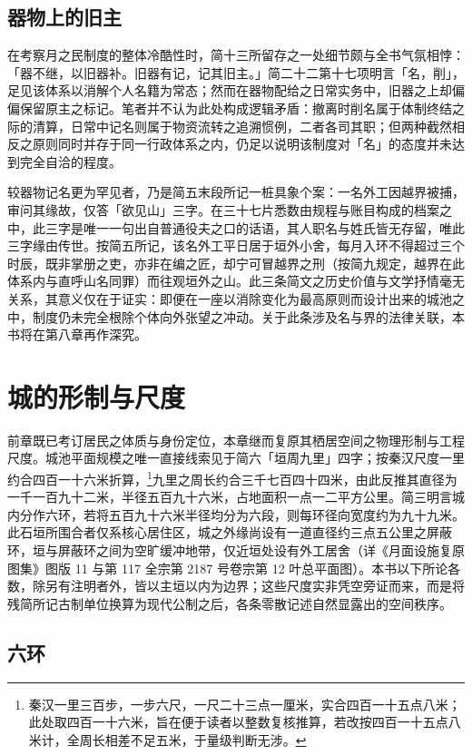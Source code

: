 \section{器物上的旧主}

在考察月之民制度的整体冷酷性时，简十三所留存之一处细节颇与全书气氛相悖：「器不继，以旧器补。旧器有记，记其旧主。」简二十二第十七项明言「名，削」，足见该体系以消解个人名籍为常态；然而在器物配给之日常实务中，旧器之上却偏偏保留原主之标记。笔者并不认为此处构成逻辑矛盾：撤离时削名属于体制终结之际的清算，日常中记名则属于物资流转之追溯惯例，二者各司其职；但两种截然相反之原则同时并存于同一行政体系之内，仍足以说明该制度对「名」的态度并未达到完全自洽的程度。

较器物记名更为罕见者，乃是简五末段所记一桩具象个案：一名外工因越界被捕，审问其缘故，仅答「欲见山」三字。在三十七片悉数由规程与账目构成的档案之中，此三字是唯一一句出自普通役夫之口的话语，其人职名与姓氏皆无存留，唯此三字缘由传世。按简五所记，该名外工平日居于垣外小舍，每月入环不得超过三个时辰，既非掌册之吏，亦非在编之匠，却宁可冒越界之刑（按简九规定，越界在此体系内与直呼山名同罪）而往观垣外之山。此三条简文之历史价值与文学抒情毫无关系，其意义仅在于证实：即便在一座以消除变化为最高原则而设计出来的城池之中，制度仍未完全根除个体向外张望之冲动。关于此条涉及名与界的法律关联，本书将在第八章再作深究。

\chapter{城的形制与尺度}

前章既已考订居民之体质与身份定位，本章继而复原其栖居空间之物理形制与工程尺度。城池平面规模之唯一直接线索见于简六「垣周九里」四字；按秦汉尺度一里约合四百一十六米折算，\footnote{秦汉一里三百步，一步六尺，一尺二十三点一厘米，实合四百一十五点八米；此处取四百一十六米，旨在便于读者以整数复核推算，若改按四百一十五点八米计，全周长相差不足五米，于量级判断无涉。}九里之周长约合三千七百四十四米，由此反推其直径为一千一百九十二米，半径五百九十六米，占地面积一点一二平方公里。简三明言城内分作六环，若将五百九十六米半径均分为六段，则每环径向宽度约为九十九米。此石垣所围合者仅系核心居住区，城之外缘尚设有一道直径约三点五公里之屏蔽环，垣与屏蔽环之间为空旷缓冲地带，仅近垣处设有外工居舍（详《月面设施复原图集》图版 11 与第 117 全宗第 2187 号卷宗第 12 叶总平面图）。本书以下所论各数，除另有注明者外，皆以主垣以内为边界；这些尺度实非凭空旁证而来，而是将残简所记古制单位换算为现代公制之后，各条零散记述自然显露出的空间秩序。

\section{六环}

